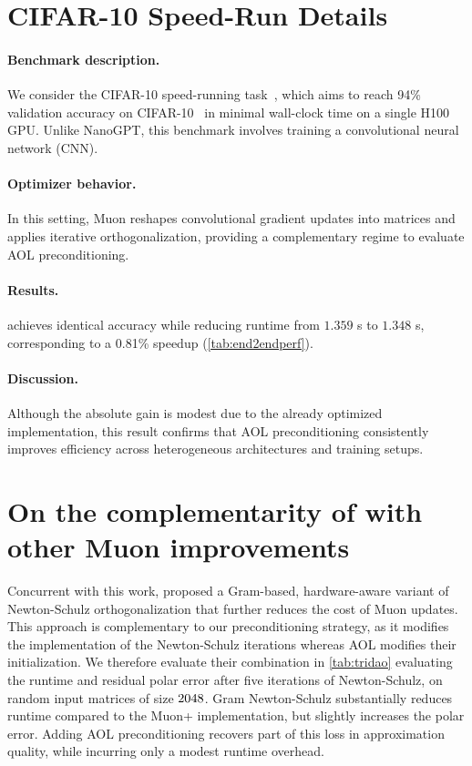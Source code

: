 \section{CIFAR-10 Speed-Run Details}
\label{ap:cifar}

\paragraph{Benchmark description.}
We consider the CIFAR-10 speed-running task~\cite{Jordan2024cifar10airbench}, which aims to reach 94\% validation accuracy on CIFAR-10~\cite{krizhevsky2009learning} in minimal wall-clock time on a single H100 GPU. Unlike NanoGPT, this benchmark involves training a convolutional neural network (CNN).

\paragraph{Optimizer behavior.}
In this setting, Muon reshapes convolutional gradient updates into matrices and applies iterative orthogonalization, providing a complementary regime to evaluate AOL preconditioning.

\paragraph{Results.}
\turbomuon achieves identical accuracy while reducing runtime from $1.359$ s to $1.348$ s, corresponding to a 0.81\% speedup (\cref{tab:end2endperf}).

\paragraph{Discussion.}
Although the absolute gain is modest due to the already optimized implementation, this result confirms that AOL preconditioning consistently improves efficiency across heterogeneous architectures and training setups.

\section{
On the complementarity of  \turbomuon with other Muon improvements
} \label{ap:tridao}

Concurrent with this work, \citet{GramNewtonSchulz} proposed a Gram-based, hardware-aware variant of Newton-Schulz orthogonalization that further reduces the cost of Muon updates. This approach is complementary to our preconditioning strategy, as it modifies the implementation of the Newton-Schulz iterations whereas AOL modifies their initialization. We therefore evaluate their combination in \cref{tab:tridao} evaluating the runtime and residual polar error after five iterations of Newton-Schulz, on random input matrices of size $2048\time 5464$. Gram Newton-Schulz substantially reduces runtime compared to the Muon+ implementation, but slightly increases the polar error. Adding AOL preconditioning recovers part of this loss in approximation quality, while incurring only a modest runtime overhead.


